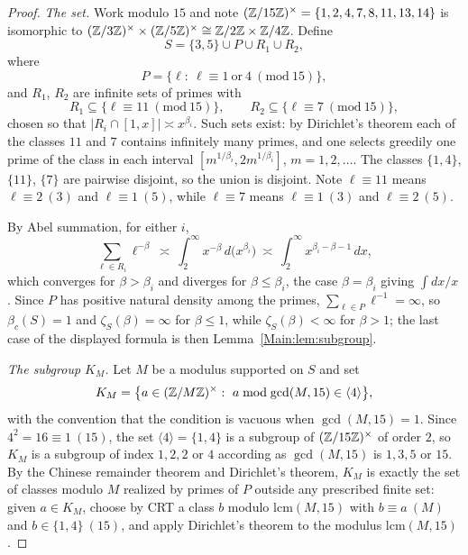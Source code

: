 \begin{proof}
\emph{The set.} Work modulo $15$ and note $(\mathbb{Z}/15\mathbb{Z})^\times=\{1,2,4,7,8,11,13,14\}$
is isomorphic to $(\mathbb{Z}/3\mathbb{Z})^\times\times(\mathbb{Z}/5\mathbb{Z})^\times\cong\mathbb{Z}/2\mathbb{Z}\times\mathbb{Z}/4\mathbb{Z}$.
Define
\[
S=\{3,5\}\cup P\cup R_1\cup R_2,
\]
where
\[
P=\{\ell:\ \ell\equiv1\ \text{or}\ 4\ (\mathrm{mod}\ 15)\},
\]
and $R_1$, $R_2$ are infinite sets of primes with
\[
R_1\subseteq\{\ell\equiv11\ (\mathrm{mod}\ 15)\},\qquad
R_2\subseteq\{\ell\equiv7\ (\mathrm{mod}\ 15)\},
\]
chosen so that $|R_i\cap[1,x]|\asymp x^{\beta_i}$. Such sets exist: by
Dirichlet's theorem each of the classes $11$ and $7$ contains infinitely many
primes, and one selects greedily one prime of the class in each interval
$[m^{1/\beta_i},2m^{1/\beta_i}]$, $m=1,2,\dots$. The classes $\{1,4\}$,
$\{11\}$, $\{7\}$ are pairwise disjoint, so the union is disjoint. Note
$\ell\equiv11$ means $\ell\equiv2\ (3)$ and $\ell\equiv1\ (5)$, while
$\ell\equiv7$ means $\ell\equiv1\ (3)$ and $\ell\equiv2\ (5)$.

By Abel summation, for either $i$,
\begin{equation}\label{Main:eq:Rconv}
\sum_{\ell\in R_i}\ell^{-\beta}\ \asymp\ \int_2^\infty x^{-\beta}\,d\bigl(x^{\beta_i}\bigr)
\ \asymp\ \int_2^\infty x^{\beta_i-\beta-1}\,dx,
\end{equation}
which converges for $\beta>\beta_i$ and diverges for $\beta\le\beta_i$, the
case $\beta=\beta_i$ giving $\int dx/x$. Since $P$ has positive natural density
among the primes, $\sum_{\ell\in P}\ell^{-1}=\infty$, so $\beta_c(S)=1$ and
$\zeta_S(\beta)=\infty$ for $\beta\le1$, while $\zeta_S(\beta)<\infty$ for
$\beta>1$; the last case of the displayed formula is then
Lemma~\ref{Main:lem:subgroup}.

\emph{The subgroup $K_M$.} Let $M$ be a modulus supported on $S$ and set
\[
K_M=\bigl\{a\in(\Z/M\Z)^\times:\ a\bmod\gcd(M,15)\in\langle4\rangle\bigr\},
\]
with the convention that the condition is vacuous when $\gcd(M,15)=1$. Since
$4^2=16\equiv1\ (15)$, the set $\langle4\rangle=\{1,4\}$ is a subgroup of
$(\mathbb{Z}/15\mathbb{Z})^\times$ of order $2$, so $K_M$ is a subgroup of index
$1,2,2$ or $4$ according as $\gcd(M,15)$ is $1,3,5$ or $15$. By the Chinese
remainder theorem and Dirichlet's theorem, $K_M$ is exactly the set of classes
modulo $M$ realized by primes of $P$ outside any prescribed finite set: given
$a\in K_M$, choose by CRT a class $b$ modulo $\mathrm{lcm}(M,15)$ with
$b\equiv a\ (M)$ and $b\in\{1,4\}\ (15)$, and apply Dirichlet's theorem to the
modulus $\mathrm{lcm}(M,15)$.


\end{proof}
